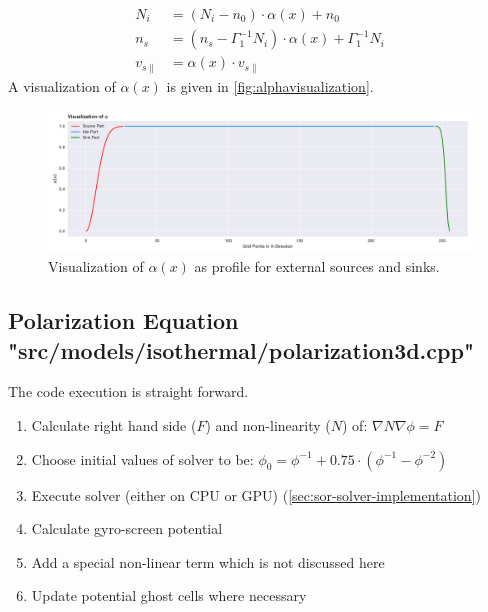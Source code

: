 \documentclass[master.tex]{subfiles}
\begin{document}
\begin{equation}
    \begin{split}
        N_i &= (N_i - n_0) \cdot \alpha(x) + n_0\\
        n_s &= (n_s - \Gamma_1^{-1}N_i) \cdot \alpha(x) + \Gamma_1^{-1}N_i\\
        v_{s\parallel} &= \alpha(x) \cdot v_{s\parallel}
    \end{split}
\end{equation}
A visualization of $\alpha(x)$ is given in \autoref{fig:alphavisualization}.
\begin{figure}[!hbtp]
    \includegraphics[width=\linewidth]{pdfs/alphavisualization.pdf}
    \caption{Visualization of $\alpha(x)$ as profile for external sources and sinks.}
    \label{fig:alphavisualization}
\end{figure}
 
 \subsection{Polarization Equation {\small "src/models/isothermal/polarization3d.cpp"}}
\label{sec:components-polarization}
The code execution is straight forward.
\begin{enumerate}
    \item Calculate right hand side ($F$) and non-linearity ($N$) of: $\nabla N \nabla \phi = F$
    \item Choose initial values of solver to be: $\phi_0 = \phi^{-1} + 0.75 \cdot (\phi^{-1} - \phi^{-2})$
    \item Execute solver (either on CPU or GPU) (\autoref{sec:sor-solver-implementation})
    \item Calculate gyro-screen potential
    \item Add a special non-linear term which is not discussed here
    \item Update potential ghost cells where necessary
\end{enumerate}
\end{document}

